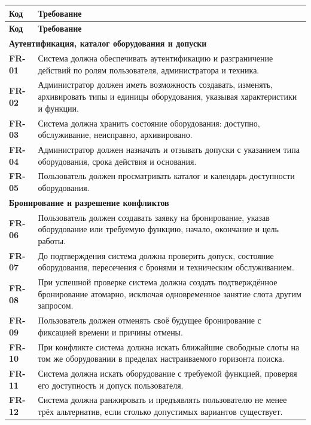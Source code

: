 \documentclass[12pt,a4paper]{article}
\newcommand{\req}[1]{\textbf{#1}}
\begin{document}
\begin{longtable}{|p{}|p{}|}
\hline
\textbf{Код} & \textbf{Требование} \\
\hline
\endfirsthead
\hline
\textbf{Код} & \textbf{Требование} \\
\hline
\endhead
\multicolumn{2}{|l|}{\textbf{Аутентификация, каталог оборудования и допуски}} \\
\hline
\req{FR-01} & Система должна обеспечивать аутентификацию и разграничение
действий по ролям пользователя, администратора и техника. \\
\hline
\req{FR-02} & Администратор должен иметь возможность создавать, изменять,
архивировать типы и единицы оборудования, указывая характеристики и функции. \\
\hline
\req{FR-03} & Система должна хранить состояние оборудования: доступно,
обслуживание, неисправно, архивировано. \\
\hline
\req{FR-04} & Администратор должен назначать и отзывать допуски с указанием
типа оборудования, срока действия и основания. \\
\hline
\req{FR-05} & Пользователь должен просматривать каталог и календарь доступности
оборудования. \\
\hline
\multicolumn{2}{|l|}{\textbf{Бронирование и разрешение конфликтов}} \\
\hline
\req{FR-06} & Пользователь должен создавать заявку на бронирование, указав
оборудование или требуемую функцию, начало, окончание и цель работы. \\
\hline
\req{FR-07} & До подтверждения система должна проверить допуск, состояние
оборудования, пересечения с бронями и техническим обслуживанием. \\
\hline
\req{FR-08} & При успешной проверке система должна создать подтверждённое
бронирование атомарно, исключая одновременное занятие слота другим запросом. \\
\hline
\req{FR-09} & Пользователь должен отменять своё будущее бронирование с
фиксацией времени и причины отмены. \\
\hline
\req{FR-10} & При конфликте система должна искать ближайшие свободные слоты на
том же оборудовании в пределах настраиваемого горизонта поиска. \\
\hline
\req{FR-11} & Система должна искать оборудование с требуемой функцией, проверяя
его доступность и допуск пользователя. \\
\hline
\req{FR-12} & Система должна ранжировать и предъявлять пользователю не менее
трёх альтернатив, если столько допустимых вариантов существует. \\

\end{longtable}
\end{document}
